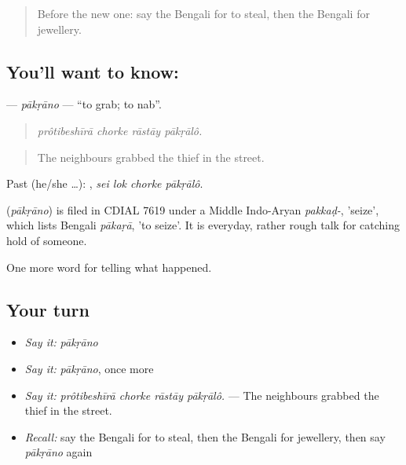 \label{lesson:BN-C282-pakrano}



\begin{quote}
Before the new one: say the Bengali for to steal, then the Bengali for jewellery.
\end{quote}

\subsection*{You'll want to know: }
\textbf{} — \emph{pākṛāno} — \textquotedblleft{}to grab; to nab\textquotedblright{}.

\begin{quote}
   
\end{quote}

\begin{quote}
\emph{prôtibeshīrā chorke rāstāy pākṛālô.}
\end{quote}

\begin{quote}
The neighbours grabbed the thief in the street.
\end{quote}

Past (he/she …):    , \emph{sei lok chorke pākṛālô}.

\begin{cousinweb}
\textbf{} (\emph{pākṛāno}) is filed in CDIAL 7619 under a Middle Indo-Aryan \emph{pakkaḍ-}, 'seize', which lists Bengali \emph{pākaṛā}, 'to seize'. It is everyday, rather rough talk for catching hold of someone.
\end{cousinweb}

\begin{grammarlens}[title={What you've built}]
One more word for telling what happened.
\end{grammarlens}

\subsection*{Your turn}
\begin{itemize}
\raggedright
  \item \emph{Say it:} \emph{pākṛāno}
  \item \emph{Say it:} \emph{pākṛāno}, once more
  \item \emph{Say it:} \emph{prôtibeshīrā chorke rāstāy pākṛālô.} — The neighbours grabbed the thief in the street.
  \item \emph{Recall:} say the Bengali for to steal, then the Bengali for jewellery, then say \emph{pākṛāno} again
\end{itemize}

